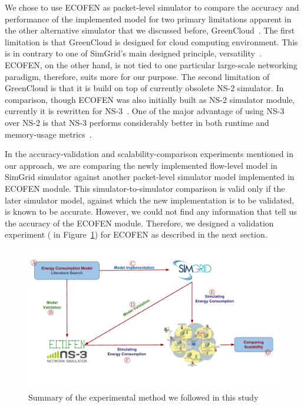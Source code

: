 We chose to use ECOFEN as packet-level simulator to compare the accuracy and performance of the implemented model for two primary limitations apparent in the other alternative simulator that we discussed before, GreenCloud~\cite{DBLP:journals/tjs/KliazovichBK12}. The first limitation is that GreenCloud is designed for cloud computing environment. This is in contrary to one of SimGrid's main designed principle, versatility~\cite{DBLP:journals/jpdc/CasanovaGLQS14}. ECOFEN, on the other hand, is not tied to one particular large-scale networking paradigm, therefore, suits more for our purpose. The second limitation of GreenCloud is that it is build on top of currently obsolete NS-2 simulator. In comparison, though ECOFEN was also initially built as NS-2 simulator module, currently it is rewritten for NS-3~\cite{DBLP:conf/cloudnet/CorneaOL14}. One of the major advantage of using NS-3 over NS-2 is that NS-3 performs considerably better in both runtime and memory-usage metrics~\cite{DBLP:conf/icc/WeingartnerLW09}.

In the accuracy-validation and scalability-comparison experiments mentioned in our approach, we are comparing the newly implemented flow-level model in SimGrid simulator against another packet-level simulator model implemented in ECOFEN module. This simulator-to-simulator comparison is valid only if the later simulator model, against which the new implementation is to be validated, is known to be accurate. However, we could not find any information that tell us the accuracy of the ECOFEN module. Therefore, we designed a validation experiment ( in Figure~\ref{fig:approach}) for ECOFEN as described in the next section. 
\begin{figure}[ht]
	\begin{center}
		\includegraphics[width=13cm]{images/approach.pdf}
		\vspace*{-1.0cm}
		\caption{Summary of the experimental method we followed in this study}
		\label{fig:approach}
	\end{center}
\end{figure}

